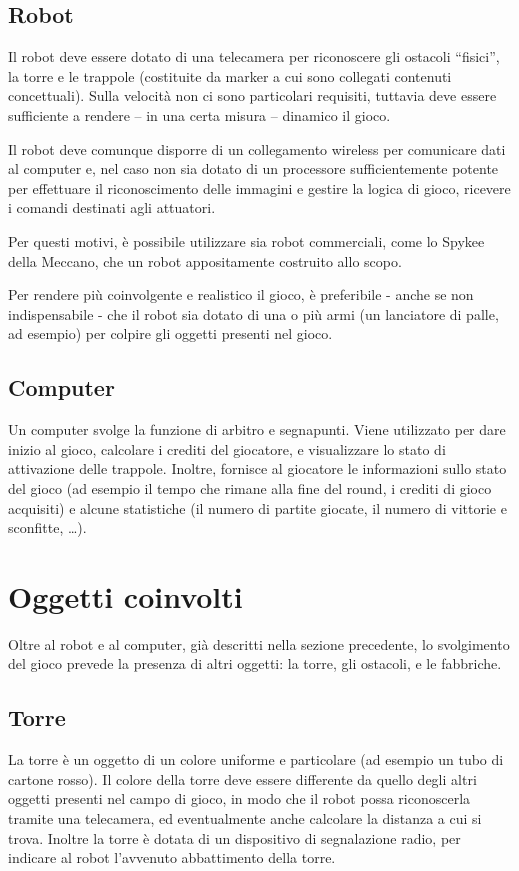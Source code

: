 \subsection*{Robot}
Il robot deve essere dotato di una telecamera per riconoscere gli ostacoli ``fisici'', la torre e le trappole (costituite da marker a cui sono collegati contenuti concettuali). Sulla velocità non ci sono particolari requisiti, tuttavia deve essere sufficiente a rendere – in una certa misura – dinamico il gioco.

Il robot deve comunque disporre di un collegamento wireless per comunicare dati al computer e, nel caso non sia dotato di un processore sufficientemente potente per effettuare il riconoscimento delle immagini e gestire la logica di gioco, ricevere i comandi destinati agli attuatori.

Per questi motivi, è possibile utilizzare sia robot commerciali, come lo Spykee della Meccano, che un robot appositamente costruito allo scopo.

Per rendere più coinvolgente e realistico il gioco, è preferibile - anche se non indispensabile - che il robot sia dotato di una o più armi (un lanciatore di palle, ad esempio) per colpire gli oggetti presenti nel gioco.

\subsection*{Computer} Un computer svolge la funzione di arbitro e segnapunti. Viene utilizzato per dare inizio al gioco, calcolare i crediti del giocatore, e visualizzare lo stato di attivazione delle trappole. Inoltre, fornisce al giocatore le informazioni sullo stato del gioco (ad esempio il tempo che rimane alla fine del round, i crediti di gioco acquisiti) e alcune statistiche (il numero di partite giocate, il numero di vittorie e sconfitte, \dots).

\section{Oggetti coinvolti}
Oltre al robot e al computer, già descritti nella sezione precedente, lo svolgimento del gioco prevede la presenza di altri oggetti: la torre, gli ostacoli, e le fabbriche.

\subsection*{Torre} La torre è un oggetto di un colore uniforme e particolare (ad esempio un tubo di cartone rosso). Il colore della torre deve essere differente da quello degli altri oggetti presenti nel campo di gioco, in modo che il robot possa riconoscerla tramite una telecamera, ed eventualmente anche calcolare la distanza a cui si trova. Inoltre la torre è dotata di un dispositivo di segnalazione radio, per indicare al robot l'avvenuto abbattimento della torre.

